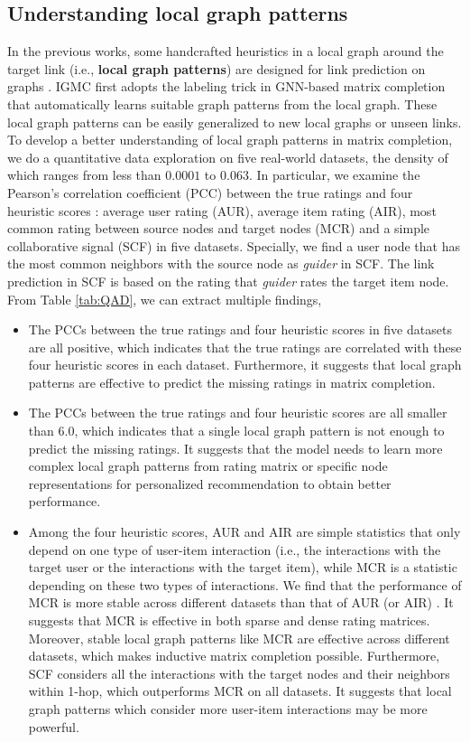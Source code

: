 \documentclass[sigconf]{acmart}
\begin{document}
\subsection{Understanding local graph patterns}
\label{sub_sec_1}
In the previous works, some handcrafted heuristics in a local graph around the target link (i.e., \textbf{local graph patterns}) are designed for link prediction on graphs \cite{liben2007link}. IGMC first adopts the labeling trick in GNN-based matrix completion that automatically learns suitable graph patterns from the local graph. 
These local graph patterns can be easily generalized to new local graphs or unseen links. 
To develop a better understanding of local graph patterns in matrix completion, we do a quantitative data exploration on five real-world datasets, the density of which ranges from less than $0.0001$ to $0.063$. In particular, we examine the Pearson's correlation coefficient (PCC) between the true ratings and four heuristic scores \cite{liben2007link, zeng2021graph}: average user rating (AUR), average item rating (AIR), most common rating between source nodes and target nodes (MCR) and a simple collaborative signal (SCF) in five datasets. Specially, we find a user node that has the most common neighbors with the source node as \emph{guider} in SCF. The link prediction in SCF is based on the rating that \emph{guider} rates the target item node. From Table \ref{tab:QAD}, we can extract multiple findings,
\begin{itemize}[leftmargin=*]
    \item The PCCs between the true ratings and four heuristic scores in five datasets are all positive, which indicates that the true ratings are correlated with these four heuristic scores in each dataset. Furthermore, it suggests that local graph patterns are effective to predict the missing ratings in matrix completion.
    \item The PCCs between the true ratings and four heuristic scores are all smaller than $6.0$, which indicates that a single local graph pattern is not enough to predict the missing ratings. It suggests that the model needs to learn more complex local graph patterns from rating matrix or specific node representations for personalized recommendation to obtain better performance.
    \item Among the four heuristic scores, AUR and AIR are simple statistics that only depend on one type of user-item interaction (i.e., the interactions with the target user or the interactions with the target item), while MCR is a statistic depending on these two types of interactions. We find that the performance of MCR is more stable across different datasets than that of AUR (or AIR) . It suggests that MCR is effective in both sparse and dense rating matrices. Moreover, stable local graph patterns like MCR are effective across different datasets, which makes inductive matrix completion possible. Furthermore, SCF considers all the interactions with the target nodes and their neighbors within 1-hop, which outperforms MCR on all datasets. It suggests that local graph patterns which consider more user-item interactions may be more powerful.  
\end{itemize}
\end{document}
